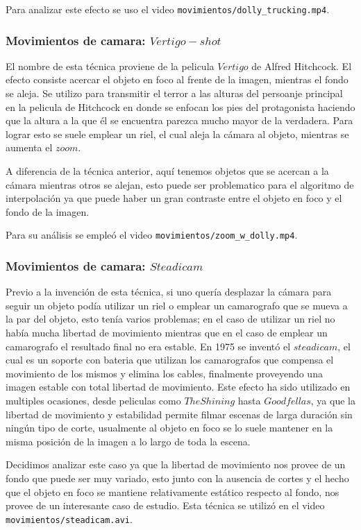 Para analizar este efecto se uso el video \texttt{movimientos/dolly\_trucking.mp4}.

\subsubsection{Movimientos de camara: $Vertigo-shot$}

El nombre de esta técnica proviene de la pelicula $Vertigo$ de Alfred Hitchcock. El efecto consiste acercar el objeto en foco al frente de la imagen, mientras el fondo se aleja. Se utilizo para transmitir el terror a las alturas del persoanje principal en la pelicula de Hitchcock en donde se enfocan los pies del protagonista haciendo que la altura a la que él se encuentra parezca mucho mayor de la verdadera. Para lograr esto se suele emplear un riel, el cual aleja la cámara al objeto, mientras se aumenta el $zoom$.

A diferencia de la técnica anterior, aquí tenemos objetos que se acercan a la cámara mientras otros se alejan, esto puede ser problematico para el algoritmo de interpolación ya que puede haber un gran contraste entre el objeto en foco y el fondo de la imagen. 

Para su análisis se empleó el video \texttt{movimientos/zoom\_w\_dolly.mp4}.

\subsubsection{Movimientos de camara: $Steadicam$}

Previo a la invención de esta técnica, si uno quería desplazar la cámara para seguir un objeto podía utilizar un riel o emplear un camarografo que se mueva a la par del objeto, esto tenía varios problemas; en el caso de utilizar un riel no había mucha libertad de movimiento mientras que en el caso de emplear un camarografo el resultado final no era estable. En 1975 se inventó el $steadicam$, el cual es un soporte con bateria que utilizan los camarografos que compensa el movimiento de los mismos y elimina los cables, finalmente proveyendo una imagen estable con total libertad de movimiento. Este efecto ha sido utilizado en multiples ocasiones, desde peliculas como $The Shining$ hasta $Goodfellas$, ya que la libertad de movimiento y estabilidad permite filmar escenas de larga duración sin ningún tipo de corte, usualmente al objeto en foco se lo suele mantener en la misma posición de la imagen a lo largo de toda la escena.

Decidimos analizar este caso ya que la libertad de movimiento nos provee de un fondo que puede ser muy variado, esto junto con la ausencia de cortes y el hecho que el objeto en foco se mantiene relativamente estático respecto al fondo, nos provee de un interesante caso de estudio. Esta técnica se utilizó en el video \texttt{movimientos/steadicam.avi}.

